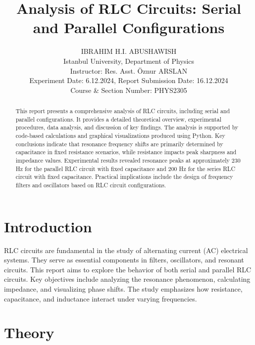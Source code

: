 \documentclass[journal]{IEEEtran}
\begin{document}
 
\title{Analysis of RLC Circuits: Serial and Parallel Configurations}
\author{IBRAHIM H.I. ABUSHAWISH \\
Istanbul University, Department of Physics \\
Instructor: Res. Asst. Öznur ARSLAN \\
Experiment Date: 6.12.2024, Report Submission Date: 16.12.2024\\
Course \& Section Number: PHYS2305}

\maketitle

\begin{abstract}
    This report presents a comprehensive analysis of RLC circuits, including serial and parallel configurations. It provides a detailed theoretical overview, experimental procedures, data analysis, and discussion of key findings. The analysis is supported by code-based calculations and graphical visualizations produced using Python. Key conclusions indicate that resonance frequency shifts are primarily determined by capacitance in fixed resistance scenarios, while resistance impacts peak sharpness and impedance values. Experimental results revealed resonance peaks at approximately 230 Hz for the parallel RLC circuit with fixed capacitance and 200 Hz for the series RLC circuit with fixed capacitance. Practical implications include the design of frequency filters and oscillators based on RLC circuit configurations.
\end{abstract}
    
\section{Introduction}
RLC circuits are fundamental in the study of alternating current (AC) electrical systems. They serve as essential components in filters, oscillators, and resonant circuits. This report aims to explore the behavior of both serial and parallel RLC circuits. Key objectives include analyzing the resonance phenomenon, calculating impedance, and visualizing phase shifts. The study emphasizes how resistance, capacitance, and inductance interact under varying frequencies.

\section{Theory}
\end{document}
